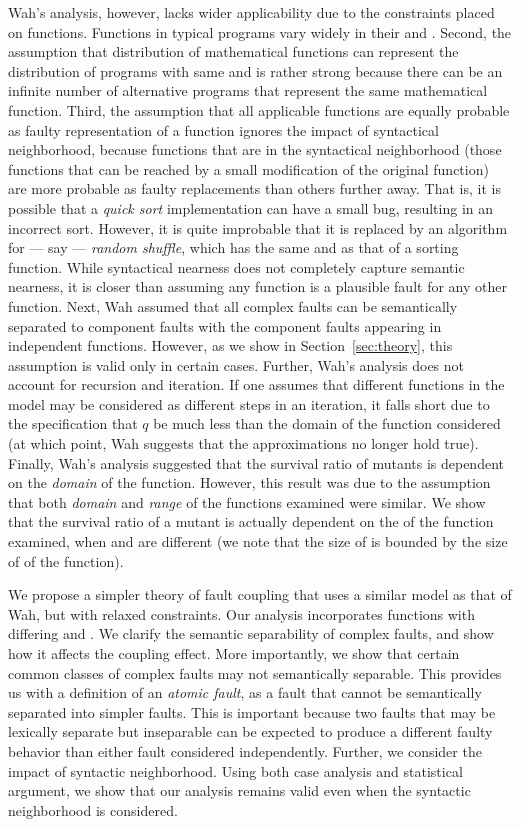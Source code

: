 \documentclass[preprint,nonatbib]{sigplanconf}\usepackage[]{graphicx}\usepackage[]{color}
\begin{document}
Wah's analysis, however, lacks wider applicability due to the constraints
placed on functions. Functions in typical programs vary widely in their \finput
and \foutput. Second, the assumption that distribution of mathematical functions
can represent the distribution of programs with same \finput and \foutput
is rather strong because there can be an infinite number of alternative programs
that represent the same mathematical function.
Third, the assumption that all applicable functions are equally
probable as faulty representation of a function ignores the
impact of syntactical neighborhood, because functions that are in the
syntactical neighborhood (those functions that can be reached by a small
modification of the original function) are more probable as faulty replacements
than others further away. That is, it is possible that a \emph{quick sort}
implementation can have a small bug, resulting in an incorrect sort. However,
it is quite improbable that it is replaced by an algorithm for --- say ---
\emph{random shuffle}, which has
the same \finput and \foutput as that of a sorting function.  While
syntactical nearness does not completely capture semantic nearness, it
is closer than assuming any function is a plausible fault for any
other function.  Next, Wah assumed that all complex faults can be semantically
separated to component faults with the component faults appearing in independent
functions. However, as we show in
Section~\ref{sec:theory}, this assumption is valid only in certain cases.
Further, Wah's analysis does not account for recursion and iteration. If one
assumes that different functions in the \qfunction model may be considered as
different steps in an iteration, it falls short due to the specification that
$q$ be much less than the domain of the function considered (at which point,
Wah suggests that the approximations no longer hold true).
Finally, Wah's analysis suggested that
the survival ratio of mutants is dependent on the \emph{domain} of the
function. However, this result was due to the assumption that both \emph{domain}
and \emph{range} of the functions examined were similar. We show that the
survival ratio of a mutant is actually dependent on the \foutput of the function
examined, when \finput and \foutput are different (we note that the size of \foutput is
bounded by the size of \finput of the function).

We propose a simpler theory of fault coupling that uses a similar model as that
of Wah, but with relaxed constraints. Our
analysis incorporates functions with differing \finput and \foutput. We clarify
the semantic separability of complex faults, and show how it affects the
coupling effect.
More importantly, we show that certain common classes of complex faults may not
semantically separable.
This provides us with a definition of an \emph{atomic fault}, as a fault that
cannot be semantically separated into simpler faults. This is important because
two faults that may be lexically separate but inseparable can be expected to
produce a different faulty behavior than either fault considered independently.
Further, we consider the impact of syntactic neighborhood. Using both case
analysis and statistical argument, we show that our
analysis remains valid even when the syntactic neighborhood is considered.
\end{document}
